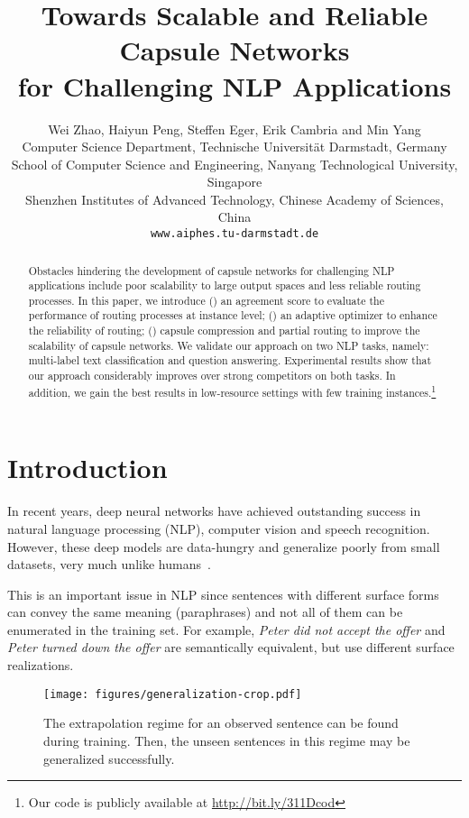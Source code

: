 \documentclass[11pt,a4paper]{article}
\title{Towards Scalable and Reliable Capsule Networks\\for Challenging NLP Applications}
\author{Wei Zhao, Haiyun Peng, Steffen Eger, Erik Cambria and Min Yang\\
{ Computer Science Department, Technische Universit\"at Darmstadt, Germany}\\
{ School of Computer Science and
Engineering, Nanyang Technological University, Singapore}\\
{ Shenzhen Institutes of Advanced Technology, Chinese Academy of Sciences, China}\\
{\tt www.aiphes.tu-darmstadt.de}
}
\date{}
\newcommand{\1}{\boldsymbol{1}}
\begin{document}
\maketitle
\begin{abstract}
Obstacles hindering the development of capsule networks for challenging NLP applications include poor scalability to large output spaces and less reliable routing processes.
In this paper, we introduce () an agreement score to evaluate the performance of routing processes at instance level; () an adaptive optimizer to enhance the reliability of routing; () capsule compression and partial routing to improve the scalability of capsule networks. We validate our approach on two NLP tasks, namely: multi-label text classification and question answering. Experimental results show that our approach considerably improves over strong competitors on both tasks. In addition, we gain the best results in low-resource settings with few training instances.\footnote{Our code is publicly available at \href{http://bit.ly/311Dcod}{http://bit.ly/311Dcod}} 
\end{abstract}

\section{Introduction}\label{sec:introduction}
In recent years, deep neural networks have achieved outstanding success in natural language processing (NLP), computer vision and speech recognition. However, these deep models are data-hungry and generalize poorly from small datasets, very much unlike humans~\cite{Lake2015}. 

This is 
an important issue in NLP 
since 
sentences with different surface forms can convey the same meaning (paraphrases) 
and 
not all of 
them 
can be enumerated
in the training set. For example, 
\textit{Peter did not accept the offer} and \textit{Peter turned down the offer}
are semantically equivalent, but use different surface realizations. 

\iffalse
\begin{figure}
\centering
\texttt{[image: figures/capsule-crop.pdf]}
\caption{The capsule  holds one vector representing a bigram \textit{Peter was}, and its probability  shows if it is useful for the task at hand.}
\label{fig:capsules}
\vspace{-0.1in}
\end{figure}
\fi

\begin{figure}
\centering
\texttt{[image: figures/generalization-crop.pdf]}
\caption{
The extrapolation regime 
for an observed sentence can be found during training. Then, the unseen sentences in this regime may be generalized successfully.
}


\label{fig:extrapolation}
\vspace{-0.15in}
\end{figure}
\end{document}
